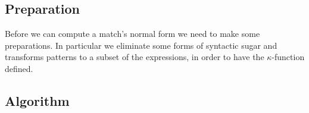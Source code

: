 \subsection{Preparation}\label{sec:preparation}
Before we can compute a match's normal form we need to make some
preparations. In particular we eliminate some forms of syntactic sugar and
transforms patterns to a subset of the expressions, in order to have the
$\kappa$-function defined.

\subsection{Algorithm}\label{sec:algorithm}

